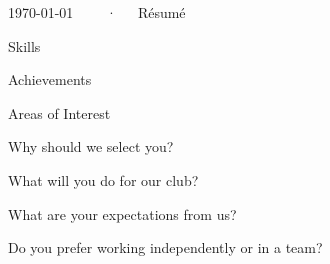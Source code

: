 \documentclass[11pt, a4paper]{awesome-cv}
\begin{document}
\makecvheader[C]

\makecvfooter
  {\today}
  {~~~~·~~~Résumé}
  {\thepage}



	\begin{cventries}
	\cventry
	{}{Skills}{}{}
	{
		\begin{cvitems}
		\item 
		\end{cvitems}
	}

	\cventry
	{}{Achievements}{}{}
	{
		\begin{cvitems}
		\item 
		\end{cvitems}
	}

	\cventry
	{}{Areas of Interest}{}{}
	{
		\begin{cvitems}
		\item 
		\end{cvitems}
	}

	\cventry
	{}{Why should we select you?}{}{}
	{
		\begin{cvitems}
		
		\end{cvitems}
	}

	\cventry
	{}{What will you do for our club?}{}{}
	{
		\begin{cvitems}
		
		\end{cvitems}
	}

	\cventry
	{}{What are your expectations from us?}{}{}
	{
		\begin{cvitems}
		
		\end{cvitems}
	}

	\cventry
	{}{Do you prefer working independently or in a team?}{}{}
	{
		\begin{cvitems}
		
		\end{cvitems}
	}

	\end{cventries}
	



\end{document}

